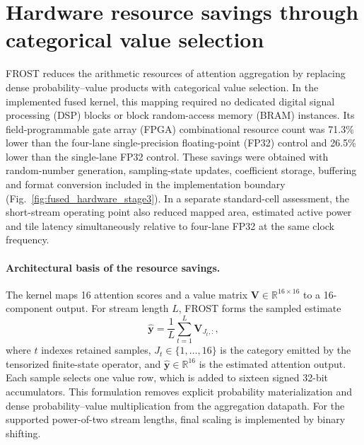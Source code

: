 \section{Hardware resource savings through categorical value selection}
\label{sec:fpga_evaluation}

FROST reduces the arithmetic resources of attention aggregation by
replacing dense probability--value products with categorical value
selection. In the implemented fused kernel, this mapping required no
dedicated digital signal processing (DSP) blocks or block random-access
memory (BRAM) instances. Its field-programmable gate array (FPGA)
combinational resource count was 71.3\% lower than the four-lane
single-precision floating-point (FP32) control and 26.5\% lower than the
single-lane FP32 control. These savings were obtained with random-number
generation, sampling-state updates, coefficient storage, buffering and
format conversion included in the implementation boundary
(Fig.~\ref{fig:fused_hardware_stage3}).
In a separate standard-cell assessment, the short-stream operating point
also reduced mapped area, estimated active power and tile latency
simultaneously relative to four-lane FP32 at the same clock frequency.

\paragraph{Architectural basis of the resource savings.}
The kernel maps 16 attention scores and a value matrix
$\boldsymbol V\in\mathbb{R}^{16\times16}$ to a 16-component output.
For stream length $L$, FROST forms the sampled estimate
\begin{equation}
\widehat{\boldsymbol y}
=\frac{1}{L}\sum_{t=1}^{L}\boldsymbol V_{J_t,:},
\label{eq:fused_categorical_attention}
\end{equation}
where $t$ indexes retained samples, $J_t\in\{1,\ldots,16\}$ is the
category emitted by the tensorized finite-state operator, and
$\widehat{\boldsymbol y}\in\mathbb{R}^{16}$ is the estimated attention
output. Each sample selects one value row, which is added to sixteen
signed 32-bit accumulators. This formulation removes explicit probability
materialization and dense probability--value multiplication from the
aggregation datapath. For the supported power-of-two stream lengths,
final scaling is implemented by binary shifting.

